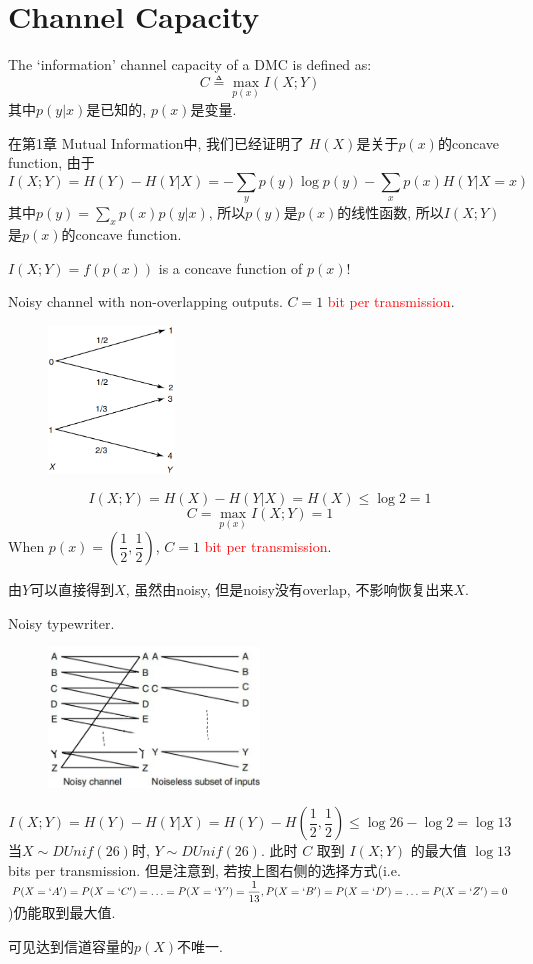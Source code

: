 \section{Channel Capacity}

The `information' channel capacity of a DMC is defined as:
$$C\triangleq \max\limits_{p(x)}I(X;Y)$$
其中$p(y|x)$是已知的, $p(x)$是变量.

在第1章 Mutual Information中, 我们已经证明了 $H(X)$是关于$p(x)$的concave function, 由于
$$I(X;Y)=H(Y)-H(Y|X)=-\sum\limits_{y}p(y)\log p(y)-\sum_{x}p(x)H(Y|X=x)$$
其中$p(y)=\sum\limits_{x}p(x)p(y|x)$, 所以$p(y)$是$p(x)$的线性函数, 所以$I(X;Y)$是$p(x)$的concave function.

$I(X;Y)=f\left(p(x)\right)$ is a concave function of $p(x)$!

\begin{example}
Noisy channel with non-overlapping outputs. $C=1$ \textcolor{red}{bit per transmission}.
\begin{figure}[htbp]
    \centering
    \includegraphics[width=0.3\textwidth]{./figures/chapter5/non_overlap.png}
\end{figure}
$$I(X;Y)=H(X)-H(Y|X)=H(X)\leq \log 2 =1$$
$$C=\max_{p(x)}I(X;Y)=1$$
When $p(x)=\left(\dfrac{1}{2},\dfrac{1}{2}\right)$, $C=1$ \textcolor{red}{bit per transmission}.

由$Y$可以直接得到$X$, 虽然由noisy, 但是noisy没有overlap, 不影响恢复出来$X$.
\end{example}

\begin{example}
Noisy typewriter.
\begin{figure}[htbp]
    \centering
    \includegraphics[width=0.5\textwidth]{./figures/chapter5/noisy_typewriter.png}
\end{figure}
$$I(X;Y)=H(Y)-H(Y|X)=H(Y)-H\left(\dfrac{1}{2},\dfrac{1}{2}\right)\leq \log 26 - \log 2 = \log 13$$
当$X\sim DUnif(26)$时, $Y\sim DUnif(26)$. 此时 $C$ 取到 $I(X;Y)$ 的最大值 $\log 13$ bits per transmission.
但是注意到, 若按上图右侧的选择方式(i.e. $P(X=`A')=P(X=`C')=\ldots=P(X=`Y')=\dfrac{1}{13},P(X=`B')=P(X=`D')=\ldots=P(X=`Z')=0$)仍能取到最大值.

可见达到信道容量的$p(X)$不唯一.
\end{example}

